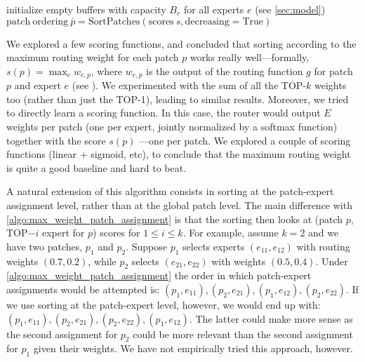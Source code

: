 \documentclass{article}
\newcommand{\maxrouting}{Batch Prioritized Routing}
\begin{document}
\begin{algorithm}[H]
\SetAlgoLined
{}
 initialize empty buffers with capacity $B_e$ for all experts $e$ (see \cref{sec:model})\;
 $ \mathrm{patch} \ \mathrm{ordering} \ \bar{p} = \mathrm{SortPatches}(\mathrm{scores} \ s, \mathrm{decreasing = True}) $\;
 \caption{\maxrouting{} Allocation}
 \label{algo:max_weight_patch_assignment}
\end{algorithm}
We explored a few scoring functions, and concluded that sorting according to the maximum routing weight for each patch $p$ works really well---formally, $s(p) = \max_e w_{e, p}$, where $w_{e, p}$ is the output of the routing function $g$ for patch $p$ and expert $e$ (see ).
We experimented with the sum of all the TOP-$k$ weights too (rather than just the TOP-1), leading to similar results.
Moreover, we tried to directly learn a scoring function.
In this case, the router would output $E$ weights per patch (one per expert, jointly normalized by a softmax function) together with the score $s(p)$ ---one per patch.
We explored a couple of scoring functions (linear + sigmoid, etc), to conclude that the maximum routing weight is quite a good baseline and hard to beat.

A natural extension of this algorithm consists in sorting at the patch-expert assignment level, rather than at the global patch level.
The main difference with \cref{algo:max_weight_patch_assignment} is that the sorting then looks at (patch $p$, TOP$-i$ expert for $p$) scores for $1 \le i \le k$.
For example, assume $k=2$ and we have two patches, $p_1$ and $p_2$.
Suppose $p_1$ selects experts $(e_{11}, e_{12})$ with routing weights $(0.7, 0.2)$, while $p_2$ selects $(e_{21}, e_{22})$ with weights $(0.5, 0.4)$.
Under \cref{algo:max_weight_patch_assignment} the order in which patch-expert assignments would be attempted is: $(p_1, e_{11}), (p_2, e_{21}), (p_1, e_{12}), (p_2, e_{22})$.
If we use sorting at the patch-expert level, however, we would end up with: $(p_1, e_{11}), (p_2, e_{21}), (p_2, e_{22}), (p_1, e_{12})$.
The latter could make more sense as the second assignment for $p_2$ could be more relevant than the second assignment for $p_1$ given their weights.
We have not empirically tried this approach, however.
\end{document}
